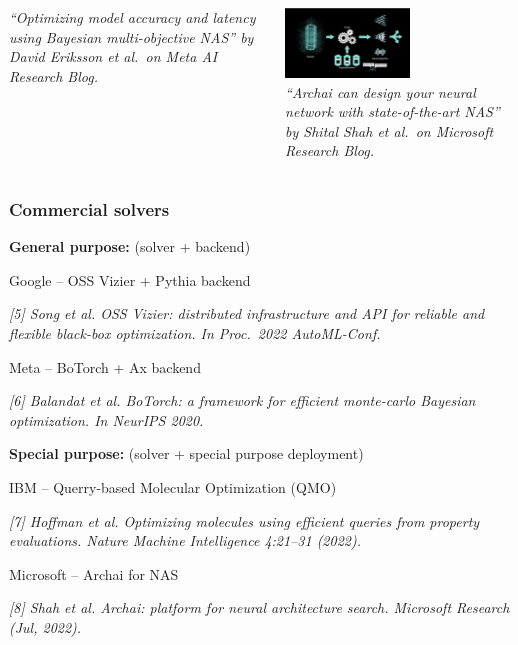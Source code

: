 \documentclass[aspectratio=169]{beamer}
\begin{document}
\begin{frame}
\begin{columns}
\begin{column}{0.33\textwidth}
\begin{center}
{\tiny \sl
``Optimizing model accuracy and latency using Bayesian multi-objective NAS''
by David Eriksson et al.\ on Meta AI Research Blog.\\
}
\end{center}
\end{column}
\pause
\begin{column}{0.33\textwidth}
\begin{center}
\includegraphics[height=5em]{../img/probs/microsoft-nas.png}\\
{\tiny \sl
``Archai can design your neural network with state-of-the-art NAS''
by Shital Shah et al.\ on Microsoft Research Blog.\\
}
\end{center}
\end{column}
\end{columns}
\end{frame}

\begin{frame}\frametitle{Commercial solvers}

\pause

{\large \bf General purpose:} (solver + backend)\\

\bigskip

Google -- OSS Vizier + Pythia backend

{\tiny\it
[5] Song et al.
OSS Vizier: distributed infrastructure and API for reliable and flexible black-box optimization.
In Proc.\ 2022 AutoML-Conf.
}

\bigskip

Meta -- BoTorch + Ax backend

{\tiny\it
[6] Balandat et al.
BoTorch: a framework for efficient monte-carlo Bayesian optimization.
In NeurIPS 2020.
}

\bigskip
\pause

{\large \bf Special purpose:} (solver + special purpose deployment)\\

\bigskip

IBM -- Querry-based Molecular Optimization (QMO)

{\tiny\it
[7] Hoffman et al.
Optimizing molecules using efficient queries from property evaluations.
Nature Machine Intelligence 4:21--31 (2022).
}

\bigskip

Microsoft -- Archai for NAS

{\tiny\it
[8] Shah et al.
Archai: platform for neural architecture search.
Microsoft Research (Jul, 2022).
}
\end{frame}
\end{document}
